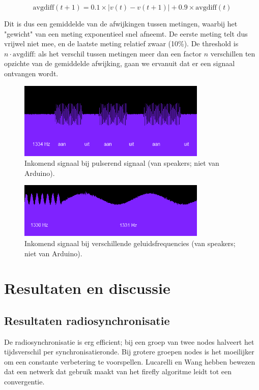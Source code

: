 \documentclass[a4paper,10pt]{article}
\begin{document}
$$\text{avgdiff}(t+1) = 0.1\times |v(t) - v(t+1)| + 0.9\times\text{avgdiff}(t)$$

Dit is dus een gemiddelde van de afwijkingen tussen metingen, waarbij het "gewicht" van een meting exponentieel snel afneemt. De eerste meting telt dus vrijwel niet mee, en de laatste meting relatief zwaar (10\%). De threshold is $n\cdot\text{avgdiff}$: als het verschil tussen metingen meer dan een factor $n$ verschillen ten opzichte van de gemiddelde afwijking, gaan we ervanuit dat er een signaal ontvangen wordt.

\begin{figure}[ht!]
    \centering
    \includegraphics[width=0.8\textwidth]{resonance_on_off_commit_ff82f.png}
    \caption{Inkomend signaal bij pulserend signaal (van speakers; niet van Arduino).}
    \label{fig:on_off}
\end{figure}

\begin{figure}[ht!]
    \centering
    \includegraphics[width=0.8\textwidth]{resonance_2_frequencies_commit_ff82f.png}
    \caption{Inkomend signaal bij verschillende geluidsfrequencies (van speakers; niet van Arduino).}
    \label{fig:resonance}
\end{figure}

\section{Resultaten en discussie}\label{sec:resultaten}
\subsection{Resultaten radiosynchronisatie}
De radiosynchronisatie is erg efficient; bij een groep van twee nodes halveert het tijdsverschil per synchronisatieronde. Bij grotere groepen nodes is het moeilijker om een constante verbetering te voorspellen. Lucarelli en Wang\cite{lucarelli2004decentralized} hebben bewezen dat een netwerk dat gebruik maakt van het firefly algoritme leidt tot een convergentie.
\end{document}
